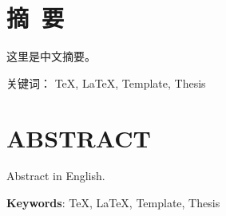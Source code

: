 \newpage

{
\let\clearpage\relax%
\centering{}

\vspace{8mm}

\chapter*{摘\ 要}
}

这里是中文摘要。

\vspace{8mm}
关键词： \TeX, \LaTeX, Template, Thesis

\newpage
\chapter*{ABSTRACT}

Abstract in English.

\vspace{8mm}

\textbf{Keywords}: \TeX, \LaTeX, Template, Thesis